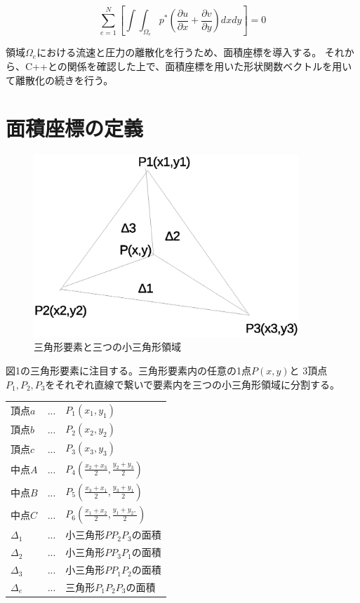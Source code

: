 \documentclass{jarticle}
\begin{document}
\begin{equation}
\displaystyle
\sum_{e=1}^N\left[\int\int_{\Omega_e} p^*\left(\frac{\partial u}{\partial x}+\frac{\partial v}{\partial y}\right)dxdy\right] = 0
\end{equation}

領域$\Omega_e$における流速と圧力の離散化を行うため、面積座標を導入する。
それから、C++との関係を確認した上で、面積座標を用いた形状関数ベクトルを用いて離散化の続きを行う。

\section{面積座標の定義}

\begin{figure}[h]
\begin{center} 
\includegraphics[width=10cm]{area_coordinates.eps}
\caption{三角形要素と三つの小三角形領域}
\end{center}
\end{figure}

図1の三角形要素に注目する。三角形要素内の任意の1点$P(x,y)$と
3頂点$P_1,P_2,P_3$をそれぞれ直線で繋いで要素内を三つの小三角形領域に分割する。

\begin{center}
\begin{tabular}{lll}
  $頂点a$&...&$P_1(x_1,y_1)$\\
  $頂点b$&...&$P_2(x_2,y_2)$\\
  $頂点c$&...&$P_3(x_3,y_3)$\\
  $中点A$&...&$P_4(\frac{x_2+x_3}{2},\frac{y_2+y_3}{2})$\\
  $中点B$&...&$P_5(\frac{x_3+x_1}{2},\frac{y_3+y_1}{2})$\\
  $中点C$&...&$P_6(\frac{x_1+x_2}{2},\frac{y_1+y_2,}{2})$\\
  $\Delta_1$&...&小三角形$PP_2 P_3$の面積\\
  $\Delta_2$&...&小三角形$PP_3 P_1$の面積\\
  $\Delta_3$&...&小三角形$PP_1 P_2$の面積\\
  $\Delta_e$&...&三角形$P_1 P_2 P_3$の面積
\end{tabular}
\end{center}
\end{document}

